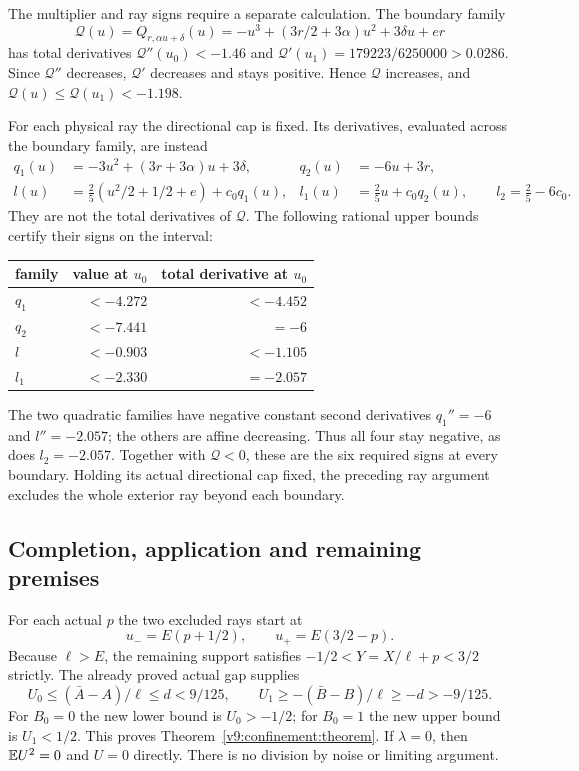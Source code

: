 The multiplier and ray signs require a separate calculation.
The boundary family
\[
 \mathcal Q(u)=Q_{r,\alpha u+\delta}(u)
 =-u^3+(3r/2+3\alpha)u^2+3\delta u+er
\]
has total derivatives $\mathcal Q''(u_0)<-1.46$ and
$\mathcal Q'(u_1)=179223/6250000>0.0286$.
Since $\mathcal Q''$ decreases, $\mathcal Q'$ decreases and stays
positive. Hence $\mathcal Q$ increases, and
$\mathcal Q(u)\le\mathcal Q(u_1)<-1.198$.

For each physical ray the directional cap is fixed. Its derivatives,
evaluated across the boundary family, are instead
\begin{align*}
 q_1(u)&=-3u^2+(3r+3\alpha)u+3\delta,&
 q_2(u)&=-6u+3r,\\
 l(u)&=\tfrac25(u^2/2+1/2+e)+c_0q_1(u),&
 l_1(u)&=\tfrac25u+c_0q_2(u),\qquad l_2=\tfrac25-6c_0.
\end{align*}
They are not the total derivatives of $\mathcal Q$.
The following rational upper bounds certify their signs on the interval:
\begin{center}
\begin{tabular}{lrr}\toprule
family & value at $u_0$ & total derivative at $u_0$\\\midrule
$q_1$ & $<-4.272$ & $<-4.452$\\
$q_2$ & $<-7.441$ & $=-6$\\
$l$   & $<-0.903$ & $<-1.105$\\
$l_1$ & $<-2.330$ & $=-2.057$\\\bottomrule
\end{tabular}
\end{center}
The two quadratic families have negative constant second derivatives
$q_1''=-6$ and $l''=-2.057$; the others are affine decreasing.
Thus all four stay negative, as does $l_2=-2.057$.
Together with $\mathcal Q<0$, these are the six required signs at every
boundary. Holding its actual directional cap fixed, the preceding ray
argument excludes the whole exterior ray beyond each boundary.

\subsection{Completion, application and remaining premises}
For each actual $p$ the two excluded rays start at
\[
 u_-=E(p+1/2),\qquad u_+=E(3/2-p).
\]
Because $\ell>E$, the remaining support satisfies
$-1/2<Y=X/\ell+p<3/2$ strictly. The already proved actual gap supplies
\[
 U_0\le(\bar A-A)/\ell\le d<9/125,
 \qquad U_1\ge-(\bar B-B)/\ell\ge-d>-9/125.
\]
For $B_0=0$ the new lower bound is $U_0>-1/2$;
for $B_0=1$ the new upper bound is $U_1<1/2$.
This proves Theorem~\ref{v9:confinement:theorem}. If $\lambda=0$, then $\mathbb E U^2=0$
and $U=0$ directly. There is no division by noise or limiting argument.

